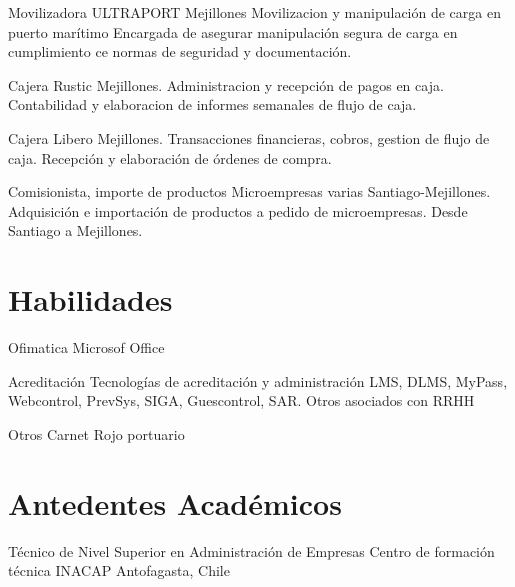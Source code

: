 \documentclass[draft,color,12pt,letterpaper,sans]{moderncv}
\begin{document}
{Movilizadora}
{\newline ULTRAPORT}
{\newline Mejillones}
{}
{Movilizacion y manipulación de carga en puerto marítimo 
\newline Encargada de asegurar manipulación segura de carga en cumplimiento ce normas de seguridad y documentación.
\newline}


{Cajera}
{\newline Rustic}
{\newline Mejillones.}
{}
{Administracion y recepción de pagos en caja. 
\newline Contabilidad y elaboracion de informes semanales de flujo de caja.
\newline}

{Cajera}
{\newline Libero}
{\newline Mejillones.}
{}
{Transacciones financieras, cobros, gestion de flujo de caja.
\newline Recepción y elaboración de órdenes de compra.
\newline}

{Comisionista, importe de productos}
{\newline Microempresas varias}
{\newline Santiago-Mejillones.}
{}
{Adquisición e importación de productos a pedido de microempresas. Desde Santiago a Mejillones.
\newline}


\newpage

\section{Habilidades}

\cventry {}
{Ofimatica}
{}
{}
{\newline Microsof Office}
{}

\cventry {}
{Acreditación}
{Tecnologías de acreditación y administración}
{}
{\newline LMS, DLMS, MyPass, Webcontrol, PrevSys, SIGA, Guescontrol, SAR. \newline Otros asociados con RRHH}
{}

\cventry {}
{Otros}
{}
{}
{\newline Carnet Rojo portuario}
{}




\section{Antedentes Académicos}
{Técnico de Nivel Superior en Administración de Empresas}
{Centro de formación técnica INACAP}
{Antofagasta, Chile}
{}
{}
\end{document}
